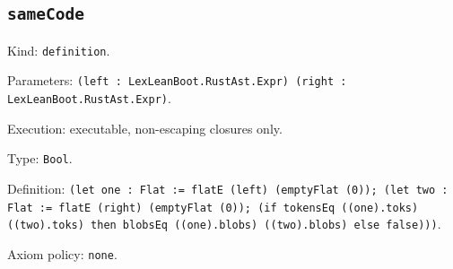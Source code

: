 \documentclass[11pt]{article}
\begin{document}
\subsection*{\texttt{sameCode}}
\noindent Kind: \texttt{definition}.\par
\noindent Parameters: \texttt{(left : LexLeanBoot.RustAst.Expr) (right : LexLeanBoot.RustAst.Expr)}.\par
\noindent Execution: executable, non-escaping closures only.\par
\noindent Type: \texttt{Bool}.\par
\noindent Definition: \texttt{(let one : Flat := flatE (left) (emptyFlat (0)); (let two : Flat := flatE (right) (emptyFlat (0)); (if tokensEq ((one).toks) ((two).toks) then blobsEq ((one).blobs) ((two).blobs) else false)))}.\par
\noindent Axiom policy: \texttt{none}.\par
\end{document}
